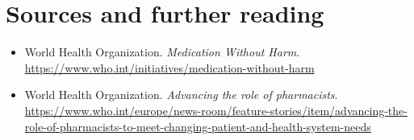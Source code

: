 \section*{Sources and further reading}
\begin{itemize}
\item World Health Organization. \textit{Medication Without Harm}. \url{https://www.who.int/initiatives/medication-without-harm}
\item World Health Organization. \textit{Advancing the role of pharmacists}. \url{https://www.who.int/europe/news-room/feature-stories/item/advancing-the-role-of-pharmacists-to-meet-changing-patient-and-health-system-needs}
\end{itemize}
